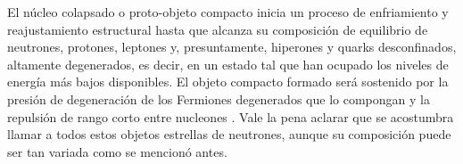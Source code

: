 El núcleo colapsado o proto-objeto compacto inicia un proceso de enfriamiento y reajustamiento estructural hasta que alcanza su composición de equilibrio de neutrones, protones, leptones y, presuntamente, hiperones y quarks desconfinados, altamente degenerados, es decir, en un estado tal que han ocupado los niveles de energía más bajos disponibles. El objeto compacto formado será sostenido por la presión de degeneración de los Fermiones degenerados que lo compongan y la repulsión de rango corto entre nucleones \cite{Piekarewicz2013}. Vale la pena aclarar que se acostumbra llamar a todos estos objetos estrellas de neutrones, aunque su composición puede ser tan variada como se mencionó antes.     
